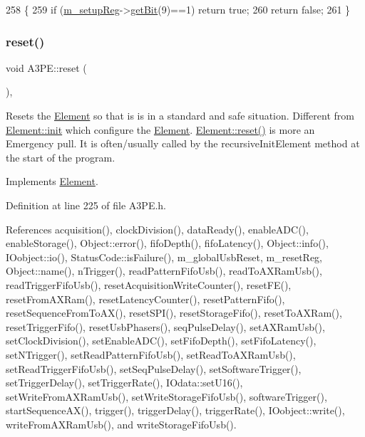 \begin{DoxyCode}
258                              \{
259   \textcolor{keywordflow}{if} (\hyperlink{classA3PE_a142fa10b7e705c4701ae21678ec2ec8a}{m\_setupReg}->\hyperlink{classRegister_a5d27c9ff548817eee097ba4fdc8e8f69}{getBit}(9)==1) \textcolor{keywordflow}{return} \textcolor{keyword}{true};
260   \textcolor{keywordflow}{return} \textcolor{keyword}{false};
261 \}
\end{DoxyCode}
\mbox{\label{classA3PE_a449775588222d544aeeaab190d553652}} 
\subsubsection{\texorpdfstring{reset()}{reset()}}
{\footnotesize\ttfamily void A3\+P\+E\+::reset (\begin{DoxyParamCaption}{ }\end{DoxyParamCaption})\hspace{0.3cm}{\ttfamily [inline]}, {\ttfamily [virtual]}}

Resets the \hyperlink{classElement}{Element} so that is is in a standard and safe situation. Different from \hyperlink{classElement_af42754b5cabc198869222725218d695c}{Element\+::init} which configure the \hyperlink{classElement}{Element}. \hyperlink{classElement_a69efffa22f06909d768149715565cb56}{Element\+::reset()} is more an Emergency pull. It is often/usually called by the recursive\+Init\+Element method at the start of the program. 

Implements \hyperlink{classElement_a69efffa22f06909d768149715565cb56}{Element}.



Definition at line 225 of file A3\+P\+E.\+h.



References acquisition(), clock\+Division(), data\+Ready(), enable\+A\+D\+C(), enable\+Storage(), Object\+::error(), fifo\+Depth(), fifo\+Latency(), Object\+::info(), I\+Oobject\+::io(), Status\+Code\+::is\+Failure(), m\+\_\+global\+Usb\+Reset, m\+\_\+reset\+Reg, Object\+::name(), n\+Trigger(), read\+Pattern\+Fifo\+Usb(), read\+To\+A\+X\+Ram\+Usb(), read\+Trigger\+Fifo\+Usb(), reset\+Acquisition\+Write\+Counter(), reset\+F\+E(), reset\+From\+A\+X\+Ram(), reset\+Latency\+Counter(), reset\+Pattern\+Fifo(), reset\+Sequence\+From\+To\+A\+X(), reset\+S\+P\+I(), reset\+Storage\+Fifo(), reset\+To\+A\+X\+Ram(), reset\+Trigger\+Fifo(), reset\+Usb\+Phasers(), seq\+Pulse\+Delay(), set\+A\+X\+Ram\+Usb(), set\+Clock\+Division(), set\+Enable\+A\+D\+C(), set\+Fifo\+Depth(), set\+Fifo\+Latency(), set\+N\+Trigger(), set\+Read\+Pattern\+Fifo\+Usb(), set\+Read\+To\+A\+X\+Ram\+Usb(), set\+Read\+Trigger\+Fifo\+Usb(), set\+Seq\+Pulse\+Delay(), set\+Software\+Trigger(), set\+Trigger\+Delay(), set\+Trigger\+Rate(), I\+Odata\+::set\+U16(), set\+Write\+From\+A\+X\+Ram\+Usb(), set\+Write\+Storage\+Fifo\+Usb(), software\+Trigger(), start\+Sequence\+A\+X(), trigger(), trigger\+Delay(), trigger\+Rate(), I\+Oobject\+::write(), write\+From\+A\+X\+Ram\+Usb(), and write\+Storage\+Fifo\+Usb().



